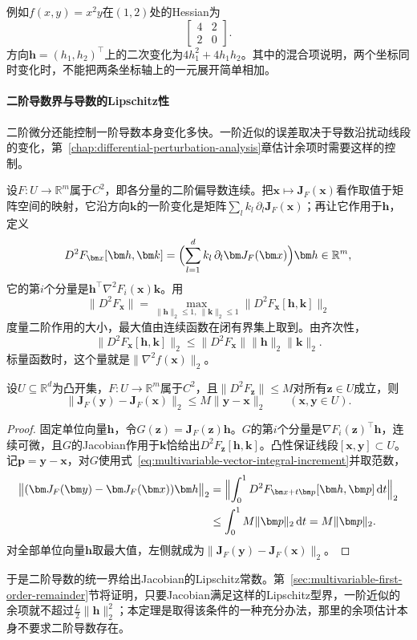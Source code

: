 例如$f(x,y)=x^2y$在$(1,2)$处的Hessian为
\[
 \begin{bmatrix}4&2\\2&0\end{bmatrix}.
\]
方向$\bm h=(h_1,h_2)^\top$上的二次变化为$4h_1^2+4h_1h_2$。其中的混合项说明，两个坐标同时变化时，不能把两条坐标轴上的一元展开简单相加。

\paragraph{二阶导数界与导数的Lipschitz性}
二阶微分还能控制一阶导数本身变化多快。一阶近似的误差取决于导数沿扰动线段的变化，第~\ref{chap:differential-perturbation-analysis}章估计余项时需要这样的控制。

设$F:U\to\mathbb R^m$属于$C^2$，即各分量的二阶偏导数连续。把$\bm x\mapsto\bm J_F(\bm x)$看作取值于矩阵空间的映射，它沿方向$\bm k$的一阶变化是矩阵$\sum_lk_l\,\partial_l\bm J_F(\bm x)$；再让它作用于$\bm h$，定义
\[
 D^2F_{\bm x}[\bm h,\bm k]=\Bigl(\sum_{l=1}^dk_l\,\partial_l\bm J_F(\bm x)\Bigr)\bm h\in\mathbb R^m ,
\]
它的第$i$个分量是$\bm h^\top\nabla^2F_i(\bm x)\bm k$。用
\[
 \lVert D^2F_{\bm x}\rVert=\max_{\lVert\bm h\rVert_2\leq1,\ \lVert\bm k\rVert_2\leq1}\lVert D^2F_{\bm x}[\bm h,\bm k]\rVert_2
\]
度量二阶作用的大小，最大值由连续函数在闭有界集上取到。由齐次性，
\[
 \lVert D^2F_{\bm x}[\bm h,\bm k]\rVert_2\leq\lVert D^2F_{\bm x}\rVert\lVert\bm h\rVert_2\lVert\bm k\rVert_2.
\]
标量函数时，这个量就是$\lVert\nabla^2f(\bm x)\rVert_2$。
\begin{theorem}[二阶导数界给出导数的Lipschitz界]
\label{thm:multivariable-second-derivative-lipschitz}
设$U\subseteq\mathbb R^d$为凸开集，$F:U\to\mathbb R^m$属于$C^2$，且$\lVert D^2F_{\bm z}\rVert\leq M$对所有$\bm z\in U$成立，则
\begin{equation}
 \lVert\bm J_F(\bm y)-\bm J_F(\bm x)\rVert_2\leq M\lVert\bm y-\bm x\rVert_2\qquad(\bm x,\bm y\in U).
\label{eq:multivariable-jacobian-lipschitz-bound}
\end{equation}
\end{theorem}
\begin{proof}
固定单位向量$\bm h$，令$G(\bm z)=\bm J_F(\bm z)\bm h$。$G$的第$i$个分量是$\nabla F_i(\bm z)^\top\bm h$，连续可微，且$G$的Jacobian作用于$\bm k$恰给出$D^2F_{\bm z}[\bm h,\bm k]$。凸性保证线段$[\bm x,\bm y]\subset U$。记$\bm p=\bm y-\bm x$，对$G$使用式~\eqref{eq:multivariable-vector-integral-increment}并取范数，
\[
 \begin{aligned}
 \bigl\lVert(\bm J_F(\bm y)-\bm J_F(\bm x))\bm h\bigr\rVert_2
 &=\Bigl\lVert\int_0^1D^2F_{\bm x+t\bm p}[\bm h,\bm p]\,\mathrm dt\Bigr\rVert_2\\
 &\leq\int_0^1M\lVert\bm p\rVert_2\,\mathrm dt=M\lVert\bm p\rVert_2 .
 \end{aligned}
\]
对全部单位向量$\bm h$取最大值，左侧就成为$\lVert\bm J_F(\bm y)-\bm J_F(\bm x)\rVert_2$。
\end{proof}
于是二阶导数的统一界给出Jacobian的Lipschitz常数。第~\ref{sec:multivariable-first-order-remainder}节将证明，只要Jacobian满足这样的Lipschitz型界，一阶近似的余项就不超过$\tfrac L2\lVert\bm h\rVert_2^2$；本定理是取得该条件的一种充分办法，那里的余项估计本身不要求二阶导数存在。

